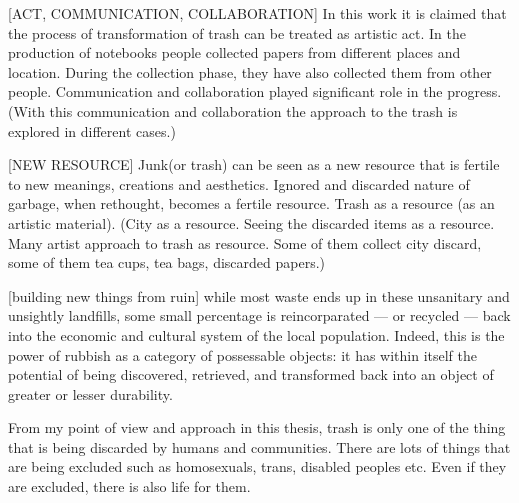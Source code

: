 [ACT, COMMUNICATION, COLLABORATION] In this work it is claimed that the process of transformation of trash can be treated as artistic act. In the production of notebooks people collected papers from different places and location. During the collection phase, they have also collected them from other people. Communication and collaboration played significant role in the progress. (With this communication and collaboration the approach to the trash is explored in different cases.)

[NEW RESOURCE] Junk(or trash) can be seen as a new resource that is fertile to new meanings, creations and aesthetics. Ignored and discarded nature of garbage, when rethought, becomes a fertile resource. Trash as a resource (as an artistic material). (City as a resource. Seeing the discarded items as a resource. Many artist approach to trash as resource. Some of them collect city discard, some of them tea cups, tea bags, discarded papers.)

[building new things from ruin]  while most waste ends up in these unsanitary and unsightly landfills, some small percentage is reincorparated --- or recycled --- back into the economic and cultural system of the local population. Indeed, this is the power of rubbish as a category of possessable objects: it has within itself the potential of being discovered, retrieved, and transformed back into an object of greater or lesser durability. 


 From my point of view and approach in this thesis, trash is only one of the thing that is being discarded by humans and communities. There are lots of things that are being excluded such as homosexuals, trans, disabled peoples etc. Even if they are excluded, there is also life for them. 









